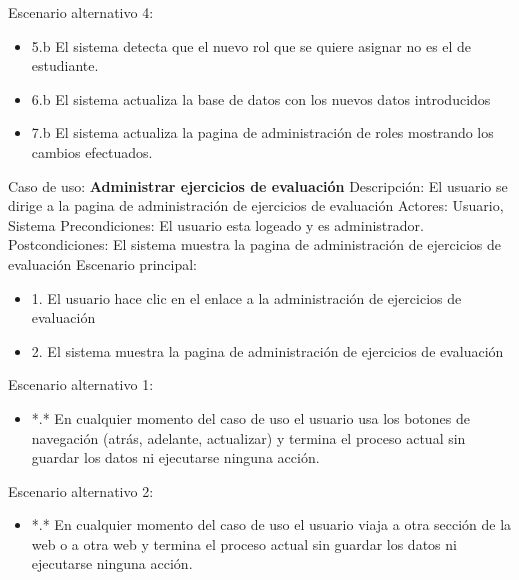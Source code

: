 Escenario alternativo 4:
\begin{itemize}
	\item 5.b El sistema detecta que el nuevo rol que se quiere asignar no es el de estudiante.
	\item 6.b El sistema actualiza la base de datos con los nuevos datos introducidos
	\item 7.b El sistema actualiza la pagina de administración de roles mostrando los cambios efectuados.
\end{itemize}

Caso de uso: \textbf{Administrar ejercicios de evaluación}
\newline
Descripción: El usuario se dirige a la pagina de administración de ejercicios de evaluación
\newline
Actores: Usuario, Sistema
\newline
Precondiciones: El usuario esta logeado y es administrador.
\newline
Postcondiciones: El sistema muestra la pagina de administración de ejercicios de evaluación
\newline
Escenario principal:
\begin{itemize}
	\item 1. El usuario hace clic en el enlace a la administración de ejercicios de evaluación
	\item 2. El sistema muestra la pagina de administración de ejercicios de evaluación
\end{itemize}
Escenario alternativo 1: 
\begin{itemize}
	\item *.* En cualquier momento del caso de uso el usuario usa los botones de navegación (atrás, adelante, actualizar) y termina el proceso actual sin guardar los datos ni ejecutarse ninguna acción.
\end{itemize}
Escenario alternativo 2: 
\begin{itemize}
	\item *.* En cualquier momento del caso de uso el usuario viaja a otra sección de la web o a otra web y termina el proceso actual sin guardar los datos ni ejecutarse ninguna acción.
\end{itemize}

